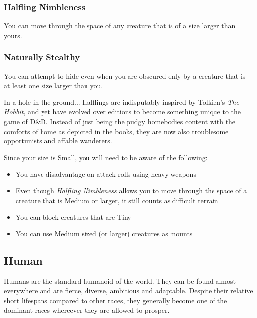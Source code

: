 \documentclass[10pt,twoside]{article}
\begin{document}
\begin{multicols}{2}
\subsubsection*{Halfling Nimbleness}
You can move through the space of any creature that is of a size larger than yours.

\subsubsection*{Naturally Stealthy}
You can attempt to hide even when you are obscured only by a creature that is at least one size larger than you.

\begin{commentbox}{In a hole in the ground...}
Halflings are indisputably inspired by Tolkien's \textit{The Hobbit}, and yet have evolved over editions to become something unique to the game of D\&D. Instead of just being the pudgy homebodies content with the comforts of home as depicted in the books, they are now also troublesome opportunists and affable wanderers.

Since your size is Small, you will need to be aware of the following:

\begin{itemize}
\item You have disadvantage on attack rolls using heavy weapons

\item Even though \textit{Halfling Nimbleness} allows you to move through the space of a creature that is Medium or larger, it still counts as difficult terrain

\item You can block creatures that are Tiny

\item You can use Medium sized (or larger) creatures as mounts
\end{itemize}

\end{commentbox}

\end{multicols}

\newpage


\subsection{Human}

Humans are the standard humanoid of the world. They can be found almost everywhere and are fierce, diverse, ambitious and adaptable. Despite their relative short lifespans compared to other races, they generally become one of the dominant races whereever they are allowed to prosper.
\end{document}
